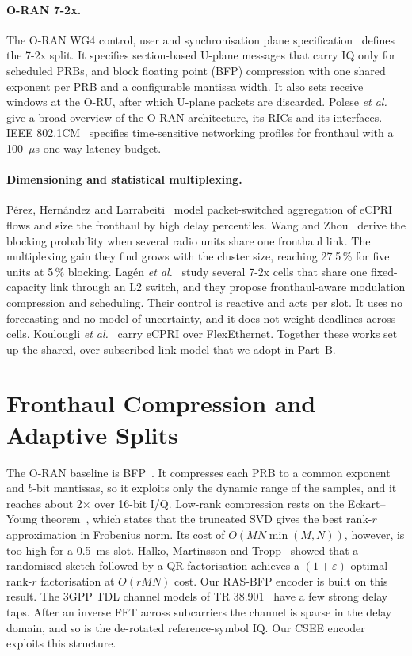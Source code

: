 \paragraph{O-RAN 7-2x.} The O-RAN WG4 control, user and synchronisation plane specification~\cite{oran_cus} defines the 7-2x split. It specifies section-based U-plane messages that carry IQ only for scheduled PRBs, and block floating point (BFP) compression with one shared exponent per PRB and a configurable mantissa width. It also sets receive windows at the O-RU, after which U-plane packets are discarded. Polese \emph{et al.}~\cite{polese2023} give a broad overview of the O-RAN architecture, its RICs and its interfaces. IEEE 802.1CM~\cite{ieee8021cm} specifies time-sensitive networking profiles for fronthaul with a 100~$\mu$s one-way latency budget.

\paragraph{Dimensioning and statistical multiplexing.} P\'erez, Hern\'andez and Larrabeiti~\cite{perez2018} model packet-switched aggregation of eCPRI flows and size the fronthaul by high delay percentiles. Wang and Zhou~\cite{wang2017} derive the blocking probability when several radio units share one fronthaul link. The multiplexing gain they find grows with the cluster size, reaching 27.5\,\% for five units at 5\,\% blocking. Lag\'en \emph{et al.}~\cite{lagen2022} study several 7-2x cells that share one fixed-capacity link through an L2 switch, and they propose fronthaul-aware modulation compression and scheduling. Their control is reactive and acts per slot. It uses no forecasting and no model of uncertainty, and it does not weight deadlines across cells. Koulougli \emph{et al.}~\cite{flexe2023} carry eCPRI over FlexEthernet. Together these works set up the shared, over-subscribed link model that we adopt in Part~B.

\section{Fronthaul Compression and Adaptive Splits}
\label{sec:lit-comp}

The O-RAN baseline is BFP~\cite{oran_cus}. It compresses each PRB to a common exponent and $b$-bit mantissas, so it exploits only the dynamic range of the samples, and it reaches about 2$\times$ over 16-bit I/Q. Low-rank compression rests on the Eckart--Young theorem~\cite{eckart1936}, which states that the truncated SVD gives the best rank-$r$ approximation in Frobenius norm. Its cost of $O(MN\min(M,N))$, however, is too high for a 0.5~ms slot. Halko, Martinsson and Tropp~\cite{halko2011} showed that a randomised sketch followed by a QR factorisation achieves a $(1+\varepsilon)$-optimal rank-$r$ factorisation at $O(rMN)$ cost. Our RAS-BFP encoder is built on this result. The 3GPP TDL channel models of TR 38.901~\cite{tr38901} have a few strong delay taps. After an inverse FFT across subcarriers the channel is sparse in the delay domain, and so is the de-rotated reference-symbol IQ. Our CSEE encoder exploits this structure.

